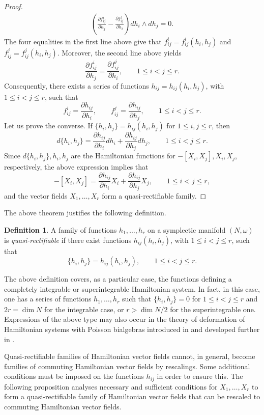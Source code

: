 \documentclass[12pt]{article}
\theoremstyle{plain}
\theoremstyle{definition}
\newtheorem{definition}[theorem]{Definition}
\numberwithin{equation}{section}
\begin{document}
\begin{proof}
$$\begin{gathered}
\left(\frac{\partial f_{ij}^i}{\partial h_j}-\frac{\partial f_{ij}^j}{\partial h_i}\right)dh_i\wedge dh_j=0.
\end{gathered}
$$
The four equalities in the first line above give that $f_{ij}^i=f_{ij}^i(h_i,h_j)$ and $f_{ij}^j=f_{ij}^j(h_i,h_j)$. Moreover, the second line above yields
$$
\frac{\partial f_{ij}^i}{\partial h_j}=\frac{\partial f_{ij}^j}{\partial h_i},\qquad 1\leq i<j\leq r.
$$
Consequently, there exists a series of functions $h_{ij}=h_{ij}(h_i,h_j)$, with $1\leq i<j\leq r$, such that
$$
f_{ij}^i=\frac{\partial h_{ij}}{\partial h_i},\qquad f_{ij}^j=\frac{\partial h_{ij}}{\partial h_j},\qquad 1\leq i<j\leq r.
$$
Let us prove the converse. If $\{h_i,h_j\}=h_{ij}(h_i,h_j)$ for $1\leq i,j\leq r$, then
$$
d\{h_i,h_j\}=\frac{\partial h_{ij}}{\partial h_i}dh_{i}+\frac{\partial h_{ij}}{\partial h_j}dh_{j},\qquad 1\leq i<j\leq r.
$$
Since $d\{h_i,h_j\},h_i,h_j$ are the Hamiltonian functions for $-[X_i,X_j],X_i,X_j$, respectively, the above expression implies that
$$
-[X_i,X_j]=\frac{\partial h_{ij}}{\partial h_i}X_{i}+\frac{\partial h_{ij}}{\partial h_j}X_{j},\qquad 1\leq i<j\leq r,
$$
and the vector fields $X_1,\ldots,X_r$ form a quasi-rectifiable family.

\end{proof}
The above theorem justifies the following definition.
\begin{definition}A family of functions $h_1,\ldots,h_r$ on a symplectic manifold $(N,\omega)$ is {\it quasi-rectifiable} if  there exist functions $h_{ij}(h_i,h_j)$, with $1\leq i<j\leq r$, such that
$$
\{h_i,h_j\}=h_{ij}(h_i,h_j),\qquad 1\leq i<j\leq r.
$$    
\end{definition}

The above definition covers, as a particular case, the functions defining a completely integrable or  superintegrable Hamiltonian system. In fact, in this case, one has a series of functions $h_1,\ldots,h_r$ such that $\{h_i,h_j\}=0$ for $1\leq i<j\leq r$ and $2r=\dim N$ for the integrable case, or $r>\dim N/2$ for the superintegrable one. Expressions of the above type may also occur in the theory of deformation of Hamiltonian systems with Poisson bialgebras introduced in \cite{BCFHL17} and  developed further in \cite{FCH23}. 

Quasi-rectifiable families of Hamiltonian vector fields cannot, in general, become families of commuting Hamiltonian vector fields by rescalings. Some additional conditions must be imposed on the functions $h_{ij}$ in order to ensure this. The following proposition analyses necessary and sufficient conditions for $X_1,\ldots,X_r$ to form a quasi-rectifiable family of Hamiltonian vector fields that can be rescaled to commuting Hamiltonian vector fields.
\end{document}
